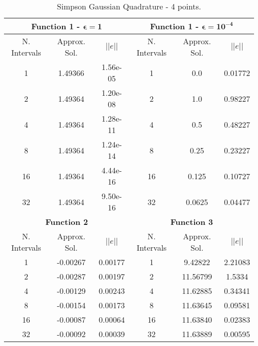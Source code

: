 \begin{table}[H]
    \centering
    \caption{Simpson Gaussian Quadrature - 4 points.}
    \begin{tabular}{ccc|ccc}
    \hline
    \multicolumn{3}{c}{\textbf{Function 1  -} $\bm{\epsilon = 1}$} & \multicolumn{3}{c}{\textbf{Function 1 -} $\bm{\epsilon = 10^{-4}}$} \\ \hline
    N. Intervals & Approx. Sol. & $|| e ||$ & N. Intervals & Approx. Sol. & $|| e ||$ \\ \hline
    1 & 1.49366 & 1.56e-05 & 1 & 0.0 & 0.01772 \\
    2 & 1.49364 & 1.20e-08 & 2 & 1.0 & 0.98227 \\
    4 & 1.49364 & 1.28e-11 & 4 & 0.5 & 0.48227 \\
    8 & 1.49364 & 1.24e-14 & 8 & 0.25 & 0.23227 \\
    16 & 1.49364 & 4.44e-16 & 16 & 0.125 & 0.10727  \\
    32 & 1.49364 & 9.50e-16 & 32 & 0.0625 & 0.04477 \\ \hline
    \multicolumn{3}{c}{\textbf{Function 2}} & \multicolumn{3}{c}{\bf{Function 3}} \\ \hline
    N. Intervals & Approx. Sol. & $|| e ||$ & N. Intervals & Approx. Sol. & $|| e ||$ \\ \hline
    1 & -0.00267 & 0.00177 & 1 & 9.42822 & 2.21083 \\ 
    2 & -0.00287 & 0.00197 & 2 & 11.56799 & 1.5334  \\
    4 & -0.00129 & 0.00243 & 4 & 11.62885 & 0.34341 \\
    8 & -0.00154 & 0.00173 & 8 & 11.63645 & 0.09581  \\
    16 & -0.00087 & 0.00064 & 16 & 11.63840 & 0.02383 \\
    32 & -0.00092 & 0.00039 & 32 & 11.63889 & 0.00595 \\ \hline
    \end{tabular}
\end{table}

